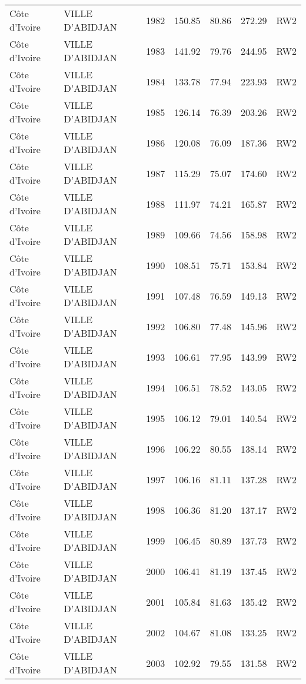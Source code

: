 \begin{longtable}{lllrrrl}
  C\^{o}te d'Ivoire & VILLE D'ABIDJAN & 1982 & 150.85 & 80.86 & 272.29 & RW2 \\ 
  C\^{o}te d'Ivoire & VILLE D'ABIDJAN & 1983 & 141.92 & 79.76 & 244.95 & RW2 \\ 
  C\^{o}te d'Ivoire & VILLE D'ABIDJAN & 1984 & 133.78 & 77.94 & 223.93 & RW2 \\ 
  C\^{o}te d'Ivoire & VILLE D'ABIDJAN & 1985 & 126.14 & 76.39 & 203.26 & RW2 \\ 
  C\^{o}te d'Ivoire & VILLE D'ABIDJAN & 1986 & 120.08 & 76.09 & 187.36 & RW2 \\ 
  C\^{o}te d'Ivoire & VILLE D'ABIDJAN & 1987 & 115.29 & 75.07 & 174.60 & RW2 \\ 
  C\^{o}te d'Ivoire & VILLE D'ABIDJAN & 1988 & 111.97 & 74.21 & 165.87 & RW2 \\ 
  C\^{o}te d'Ivoire & VILLE D'ABIDJAN & 1989 & 109.66 & 74.56 & 158.98 & RW2 \\ 
  C\^{o}te d'Ivoire & VILLE D'ABIDJAN & 1990 & 108.51 & 75.71 & 153.84 & RW2 \\ 
  C\^{o}te d'Ivoire & VILLE D'ABIDJAN & 1991 & 107.48 & 76.59 & 149.13 & RW2 \\ 
  C\^{o}te d'Ivoire & VILLE D'ABIDJAN & 1992 & 106.80 & 77.48 & 145.96 & RW2 \\ 
  C\^{o}te d'Ivoire & VILLE D'ABIDJAN & 1993 & 106.61 & 77.95 & 143.99 & RW2 \\ 
  C\^{o}te d'Ivoire & VILLE D'ABIDJAN & 1994 & 106.51 & 78.52 & 143.05 & RW2 \\ 
  C\^{o}te d'Ivoire & VILLE D'ABIDJAN & 1995 & 106.12 & 79.01 & 140.54 & RW2 \\ 
  C\^{o}te d'Ivoire & VILLE D'ABIDJAN & 1996 & 106.22 & 80.55 & 138.14 & RW2 \\ 
  C\^{o}te d'Ivoire & VILLE D'ABIDJAN & 1997 & 106.16 & 81.11 & 137.28 & RW2 \\ 
  C\^{o}te d'Ivoire & VILLE D'ABIDJAN & 1998 & 106.36 & 81.20 & 137.17 & RW2 \\ 
  C\^{o}te d'Ivoire & VILLE D'ABIDJAN & 1999 & 106.45 & 80.89 & 137.73 & RW2 \\ 
  C\^{o}te d'Ivoire & VILLE D'ABIDJAN & 2000 & 106.41 & 81.19 & 137.45 & RW2 \\ 
  C\^{o}te d'Ivoire & VILLE D'ABIDJAN & 2001 & 105.84 & 81.63 & 135.42 & RW2 \\ 
  C\^{o}te d'Ivoire & VILLE D'ABIDJAN & 2002 & 104.67 & 81.08 & 133.25 & RW2 \\ 
  C\^{o}te d'Ivoire & VILLE D'ABIDJAN & 2003 & 102.92 & 79.55 & 131.58 & RW2 \\ 

\end{longtable}
